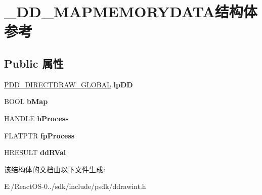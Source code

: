 \hypertarget{struct___d_d___m_a_p_m_e_m_o_r_y_d_a_t_a}{}\section{\+\_\+\+D\+D\+\_\+\+M\+A\+P\+M\+E\+M\+O\+R\+Y\+D\+A\+T\+A结构体 参考}
\label{struct___d_d___m_a_p_m_e_m_o_r_y_d_a_t_a}
\subsection*{Public 属性}
\begin{DoxyCompactItemize}
\item 
\mbox{\label{struct___d_d___m_a_p_m_e_m_o_r_y_d_a_t_a_a83d7f705bdd21c9d855e0002f882d0e9}} 
\hyperlink{struct___d_d___d_i_r_e_c_t_d_r_a_w___g_l_o_b_a_l}{P\+D\+D\+\_\+\+D\+I\+R\+E\+C\+T\+D\+R\+A\+W\+\_\+\+G\+L\+O\+B\+AL} {\bfseries lp\+DD}
\item 
\mbox{\label{struct___d_d___m_a_p_m_e_m_o_r_y_d_a_t_a_a19b4ede1ddc63bf501d987a669a16deb}} 
B\+O\+OL {\bfseries b\+Map}
\item 
\mbox{\label{struct___d_d___m_a_p_m_e_m_o_r_y_d_a_t_a_a30fad96ae672ad6d41d2ade44ba694b8}} 
\hyperlink{interfacevoid}{H\+A\+N\+D\+LE} {\bfseries h\+Process}
\item 
\mbox{\label{struct___d_d___m_a_p_m_e_m_o_r_y_d_a_t_a_a217cfe1b83e1c74b39893a560b82d9fd}} 
F\+L\+A\+T\+P\+TR {\bfseries fp\+Process}
\item 
\mbox{\label{struct___d_d___m_a_p_m_e_m_o_r_y_d_a_t_a_a95975bca2ec08a3ffcc16f6989925769}} 
H\+R\+E\+S\+U\+LT {\bfseries dd\+R\+Val}
\end{DoxyCompactItemize}


该结构体的文档由以下文件生成\+:\begin{DoxyCompactItemize}
\item 
E\+:/\+React\+O\+S-\/0../sdk/include/psdk/ddrawint.\+h\end{DoxyCompactItemize}

